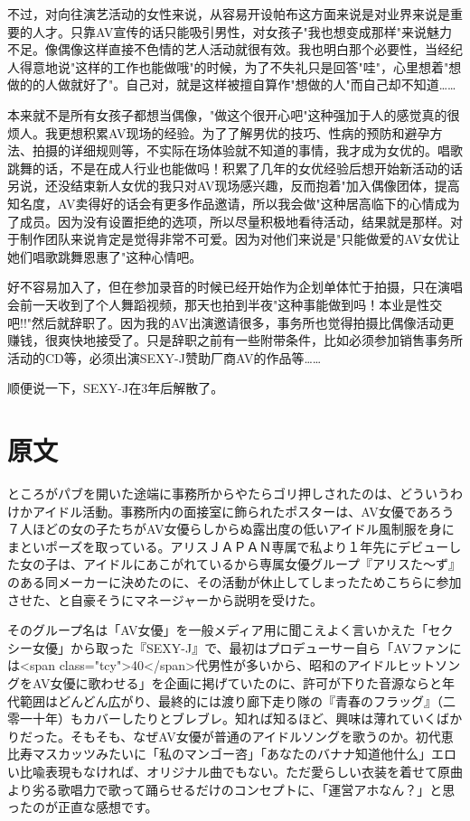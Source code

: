 \documentclass[12pt,UTF8]{ctexbook}
\begin{document}
不过，对向往演艺活动的女性来说，从容易开设帕布这方面来说是对业界来说是重要的人才。只靠AV宣传的话只能吸引男性，对女孩子"我也想变成那样"来说魅力不足。像偶像这样直接不色情的艺人活动就很有效。我也明白那个必要性，当经纪人得意地说"这样的工作也能做哦"的时候，为了不失礼只是回答"哇"，心里想着"想做的的人做就好了"。自己对，就是这样被擅自算作"想做的人"而自己却不知道……

本来就不是所有女孩子都想当偶像，"做这个很开心吧"这种强加于人的感觉真的很烦人。我更想积累AV现场的经验。为了了解男优的技巧、性病的预防和避孕方法、拍摄的详细规则等，不实际在场体验就不知道的事情，我才成为女优的。唱歌跳舞的话，不是在成人行业也能做吗！积累了几年的女优经验后想开始新活动的话另说，还没结束新人女优的我只对AV现场感兴趣，反而抱着"加入偶像团体，提高知名度，AV卖得好的话会有更多作品邀请，所以我会做"这种居高临下的心情成为了成员。因为没有设置拒绝的选项，所以尽量积极地看待活动，结果就是那样。对于制作团队来说肯定是觉得非常不可爱。因为对他们来说是"只能做爱的AV女优让她们唱歌跳舞恩惠了"这种心情吧。

好不容易加入了，但在参加录音的时候已经开始作为企划单体忙于拍摄，只在演唱会前一天收到了个人舞蹈视频，那天也拍到半夜"这种事能做到吗！本业是性交吧!!"然后就辞职了。因为我的AV出演邀请很多，事务所也觉得拍摄比偶像活动更赚钱，很爽快地接受了。只是辞职之前有一些附带条件，比如必须参加销售事务所活动的CD等，必须出演SEXY-J赞助厂商AV的作品等……

顺便说一下，SEXY-J在3年后解散了。

\switchcolumn

\section*{原文}

ところがパブを開いた途端に事務所からやたらゴリ押しされたのは、どういうわけかアイドル活動。事務所内の面接室に飾られたポスターは、AV女優であろう７人ほどの女の子たちがAV女優らしからぬ露出度の低いアイドル風制服を身にまといポーズを取っている。アリスＪＡＰＡＮ専属で私より１年先にデビューした女の子は、アイドルにあこがれているから専属女優グループ『アリスた〜ず』のある同メーカーに決めたのに、その活動が休止してしまったためこちらに参加させた、と自豪そうにマネージャーから説明を受けた。

そのグループ名は「AV女優」を一般メディア用に聞こえよく言いかえた「セクシー女優」から取った『SEXY-J』で、最初はプロデューサー自ら「AVファンには<span class="tcy">40</span>代男性が多いから、昭和のアイドルヒットソングをAV女優に歌わせる」を企画に掲げていたのに、許可が下りた音源ならと年代範囲はどんどん広がり、最終的には渡り廊下走り隊の『青春のフラッグ』（二零一十年）もカバーしたりとブレブレ。知れば知るほど、興味は薄れていくばかりだった。そもそも、なぜAV女優が普通のアイドルソングを歌うのか。初代恵比寿マスカッツみたいに「私のマンゴー咨」「あなたのバナナ知道他什么」エロい比喩表現もなければ、オリジナル曲でもない。ただ愛らしい衣装を着せて原曲より劣る歌唱力で歌って踊らせるだけのコンセプトに、「運営アホなん？」と思ったのが正直な感想です。
\end{document}
